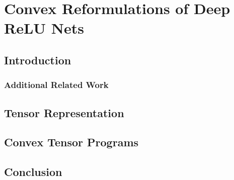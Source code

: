 
\chapter{Convex Reformulations of Deep ReLU Nets}\label{chapter:deep-reformulations}

\section{Introduction}\label{sec:deep-reformulations-intro}



\subsection{Additional Related Work}\label{sec:deep-reformulations-related-work}



\section{Tensor Representation}\label{sec:tensor-representation}



\section{Convex Tensor Programs}\label{sec:convex-tensor-programs}



\section{Conclusion}\label{sec:deep-reformulations-conclusion}



